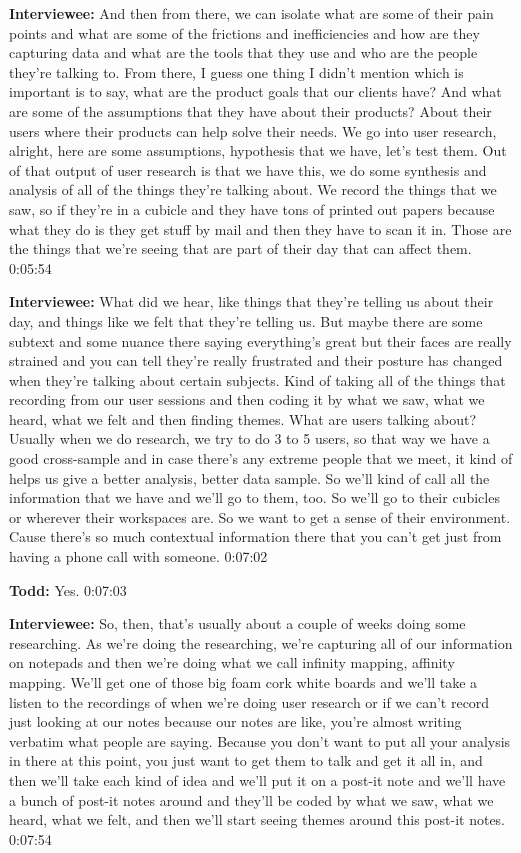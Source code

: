 \textbf{Interviewee:} And then from there, we can isolate what are some of their pain points and what are some of the frictions and inefficiencies and how are they capturing data and what are the tools that they use and who are the people they're talking to.  From there, I guess one thing I didn't mention which is important is to say, what are the product goals that our clients have?  And what are some of the assumptions that they have about their products?  About their users where their products can help solve their needs.  We go into user research, alright, here are some assumptions, hypothesis that we have, let's test them. Out of that output of user research is that we have this, we do some synthesis and analysis of all of the things they're talking about.  We record the things that we saw, so if they're in a cubicle and they have tons of printed out papers because what they do is they get stuff by mail and then they have to scan it in.  Those are the things that we're seeing that are part of their day that can affect them.   0:05:54

\textbf{Interviewee:} What did we hear, like things that they're telling us about their day, and things like we felt that they're telling us. But maybe there are some subtext and some nuance there saying everything's great but their faces are really strained and you can tell they're really frustrated and their posture has changed when they're talking about certain subjects. Kind of taking all of the things that recording from our user sessions and then coding it by what we saw, what we heard, what we felt and then finding themes. What are users talking about? Usually when we do research, we try to do 3 to 5 users, so that way we have a good cross-sample and in case there's any extreme people that we meet, it kind of helps us give a better analysis, better data sample. So we'll kind of call all the information that we have and we'll go to them, too.  So we'll go to their cubicles or wherever their workspaces are. So we want to get a sense of their environment. Cause there's so much contextual information there that you can't get just from having a phone call with someone.  0:07:02

\textbf{Todd:} Yes.  0:07:03

\textbf{Interviewee:} So, then, that's usually about a couple of weeks doing some researching.  As we're doing the researching, we're capturing all of our information on notepads and then we're doing what we call infinity mapping, affinity mapping.  We'll get one of those big foam cork white boards and we'll take a listen to the recordings of when we're doing user research or if we can't record just looking at our notes because our notes are like, you're almost writing verbatim what people are saying. Because you don't want to put all your analysis in there at this point, you just want to get them to talk and get it all in, and then we'll take each kind of idea and we'll put it on a post-it note and we'll have a bunch of post-it notes around and they'll be coded by what we saw, what we heard, what we felt, and then we'll start seeing themes around this post-it notes.   0:07:54

